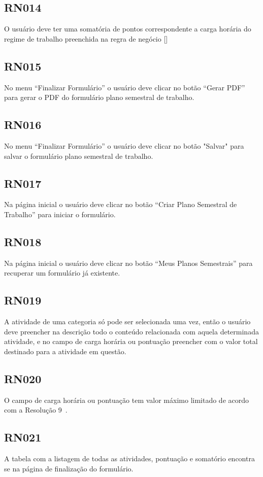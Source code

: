 \subsection{RN014}\label{rn014}

O usuário deve ter uma somatória de pontos correspondente a carga horária do regime de trabalho preenchida na regra de negócio []

\subsection{RN015}\label{rn015}

No menu ``Finalizar Formulário'' o usuário deve clicar no botão ``Gerar PDF'' para gerar o \ac{PDF} do formulário plano semestral de trabalho.

\subsection{RN016}\label{rn016}

No menu ``Finalizar Formulário'' o usuário deve clicar no botão "Salvar" para salvar o formulário plano semestral de trabalho.

\subsection{RN017}\label{rn017}

Na página inicial o usuário deve clicar no botão ``Criar Plano Semestral de Trabalho'' para iniciar o formulário.

\subsection{RN018}\label{rn018}

Na página inicial o usuário deve clicar no botão ``Meus Planos Semestrais'' para recuperar um formulário já existente.

\subsection{RN019}\label{rn019}

A atividade de uma categoria só pode ser selecionada uma vez, então o usuário deve preencher  na descrição todo o conteúdo relacionada com aquela determinada atividade, e no campo de carga horária ou pontuação preencher com o valor total destinado para a atividade em questão.

\subsection{RN020}\label{rn020}

O campo de carga horária ou pontuação tem valor máximo limitado de acordo com a Resolução 9~\citep{resolucao}.

\subsection{RN021}\label{rn021}

A tabela com a listagem de todas as atividades, pontuação e somatório encontra se na página de finalização do formulário.

